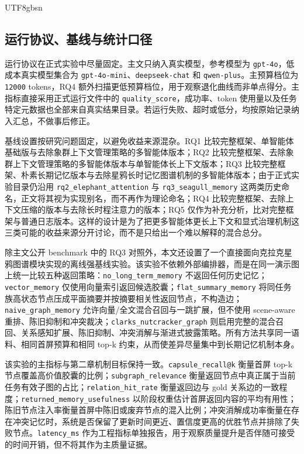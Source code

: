 \documentclass[a4paper,fleqn]{cas-sc}
\begin{document}
\begin{CJK*}{UTF8}{gbsn}
\subsection{运行协议、基线与统计口径}

运行协议在正式实验中尽量固定。主文只纳入真实模型，参考模型为 \texttt{gpt-4o}，低成本真实模型集合为 \texttt{gpt-4o-mini}、\texttt{deepseek-chat} 和 \texttt{qwen-plus}。主预算档位为 \texttt{12000} tokens，RQ4 额外扫描更低预算档位，用于观察退化曲线而非单点得分。主指标直接采用正式运行文件中的 \texttt{quality\_score}，成功率、token 使用量以及任务特定元数据也全部来自真实结果目录。若运行失败、超时或低分，均按原始记录纳入汇总，不做事后修正。

基线设置按研究问题固定，以避免收益来源混杂。RQ1 比较完整框架、单智能体基础版与去除象群上下文管理策略的多智能体版本；RQ2 比较完整框架、去除象群上下文管理策略的多智能体版本与单智能体长上下文版本；RQ3 比较完整框架、朴素长期记忆版本与去除星鸦长时记忆图谱机制的多智能体版本；由于正式实验目录仍沿用 \texttt{rq2\_elephant\_attention} 与 \texttt{rq3\_seagull\_memory} 这两类历史命名，正文将其视为实现别名，而不再作为理论命名；RQ4 比较完整框架、去除上下文压缩的版本与去除长时程注意力的版本；RQ5 仅作为补充分析，比对完整框架与普通日志版本。这样的设计是为了把更多智能体更长上下文和显式治理机制这三类可能的收益来源分开讨论，而不是只给出一个难以解释的混合总分。

除主文公开 benchmark 中的 RQ3 对照外，本文还设置了一个直接面向克拉克星鸦图谱模块实现的离线强基线实验。该实验不依赖外部编排器，而是在同一演示图上统一比较五种返回策略：\texttt{no\_long\_term\_memory} 不返回任何历史记忆；\texttt{vector\_memory} 仅使用向量索引返回候选胶囊；\texttt{flat\_summary\_memory} 将同任务族高状态节点压成平面摘要并按摘要相关性返回节点，不构造边；\texttt{naive\_graph\_memory} 允许向量/全文混合召回与一跳扩展，但不使用 scene-aware 重排、陈旧抑制和冲突裁决；\texttt{clarks\_nutcracker\_graph} 则启用完整的混合召回、关系感知扩展、陈旧抑制、冲突消解与渐进式披露策略。所有方法共享同一语料、相同首屏预算和相同 top-k 约束，从而使差异尽量集中到长期记忆机制本身。

该实验的主指标与第二章机制目标保持一致。\texttt{capsule\_recall@k} 衡量首屏 top-k 节点覆盖高价值胶囊的比例；\texttt{subgraph\_relevance} 衡量返回节点中真正属于当前任务有效子图的占比；\texttt{relation\_hit\_rate} 衡量返回边与 gold 关系边的一致程度；\texttt{returned\_memory\_usefulness} 以阶段权重估计首屏返回内容的平均有用性；陈旧节点注入率衡量首屏中陈旧或废弃节点的混入比例；冲突消解成功率衡量在存在冲突记忆时，系统是否保留了更新时间更近、置信度更高的优胜节点并排除了失败节点。\texttt{latency\_ms} 作为工程指标单独报告，用于观察质量提升是否伴随可接受的时间开销，但不将其作为主质量证据。


\end{CJK*}
\end{document}
